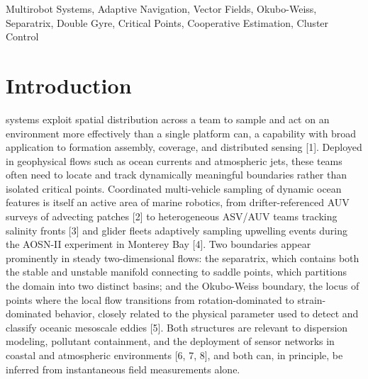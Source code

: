 \documentclass[lettersize,journal]{IEEEtran}
\begin{document}
\begin{IEEEkeywords}
Multirobot Systems, Adaptive Navigation, Vector Fields, Okubo-Weiss, Separatrix,
Double Gyre, Critical Points, Cooperative Estimation, Cluster Control
\end{IEEEkeywords}


\section{Introduction}
\label{sec:intro}

 systems exploit spatial distribution across a team to sample
and act on an environment more effectively than a single platform can, a
capability with broad application to formation assembly, coverage, and
distributed sensing [1]. Deployed in geophysical flows such as ocean
currents and atmospheric jets, these teams often need to locate and track
dynamically meaningful boundaries rather than isolated critical points.
Coordinated multi-vehicle sampling of dynamic ocean features is itself an
active area of marine robotics, from drifter-referenced AUV surveys of
advecting patches [2] to heterogeneous ASV/AUV teams tracking salinity
fronts [3] and glider fleets adaptively sampling upwelling events during
the AOSN-II experiment in Monterey Bay [4]. Two boundaries appear
prominently in steady two-dimensional flows: the separatrix, which
contains both the stable and unstable manifold connecting to saddle
points, which partitions the domain into two distinct basins; and the
Okubo-Weiss boundary, the locus of points where the local flow transitions
from rotation-dominated to strain-dominated behavior, closely related to
the physical parameter used to detect and classify oceanic mesoscale
eddies [5]. Both structures are relevant to dispersion modeling,
pollutant containment, and the deployment of sensor networks in coastal
and atmospheric environments [6, 7, 8], and both can, in principle,
be inferred from instantaneous field measurements alone.
\end{document}
